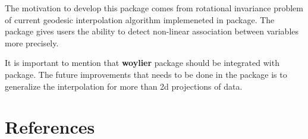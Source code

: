 The motivation to develop this package comes from rotational invariance problem of current geodesic interpolation algorithm implemeneted in  package. The package gives users the ability to detect non-linear association between variables more precisely.

It is important to mention that \textbf{woylier} package should be integrated with  package. The future improvements that needs to be done in the package is to generalize the interpolation for more than 2d projections of data.

\hypertarget{references}{%
\section*{References}\label{references}}

